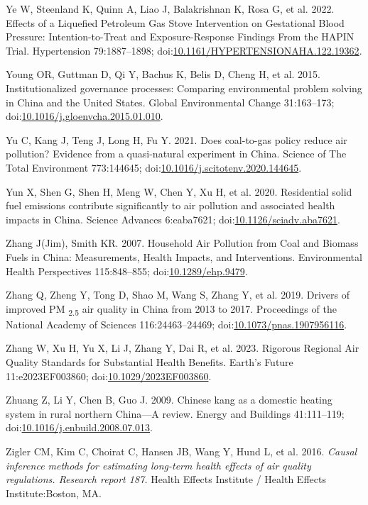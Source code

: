 \documentclass[
  letterpaper,
  DIV=11,
  numbers=noendperiod]{scrartcl}
\newlength{\cslhangindent}
\newenvironment{CSLReferences}[2] %
 {\begin{list}{}{%
  \setlength{\itemindent}{0pt}
  \setlength{\leftmargin}{0pt}
  \setlength{\parsep}{0pt}
  \ifodd #1
   \setlength{\leftmargin}{\cslhangindent}
   \setlength{\itemindent}{-1\cslhangindent}
  \fi
  \setlength{\itemsep}{#2\baselineskip}}}
 {\end{list}}
\begin{document}
\begin{CSLReferences}{1}{1}
Ye W, Steenland K, Quinn A, Liao J, Balakrishnan K, Rosa G, et al. 2022.
Effects of a {Liquefied Petroleum Gas Stove Intervention} on
{Gestational Blood Pressure}: {Intention-to-Treat} and
{Exposure-Response Findings From} the {HAPIN Trial}. Hypertension
79:1887--1898;
doi:\href{https://doi.org/10.1161/HYPERTENSIONAHA.122.19362}{10.1161/HYPERTENSIONAHA.122.19362}.

Young OR, Guttman D, Qi Y, Bachus K, Belis D, Cheng H, et al. 2015.
Institutionalized governance processes: {Comparing} environmental
problem solving in {China} and the {United States}. Global Environmental
Change 31:163--173;
doi:\href{https://doi.org/10.1016/j.gloenvcha.2015.01.010}{10.1016/j.gloenvcha.2015.01.010}.

Yu C, Kang J, Teng J, Long H, Fu Y. 2021. Does coal-to-gas policy reduce
air pollution? {Evidence} from a quasi-natural experiment in {China}.
Science of The Total Environment 773:144645;
doi:\href{https://doi.org/10.1016/j.scitotenv.2020.144645}{10.1016/j.scitotenv.2020.144645}.

Yun X, Shen G, Shen H, Meng W, Chen Y, Xu H, et al. 2020. Residential
solid fuel emissions contribute significantly to air pollution and
associated health impacts in {China}. Science Advances 6:eaba7621;
doi:\href{https://doi.org/10.1126/sciadv.aba7621}{10.1126/sciadv.aba7621}.

Zhang J(Jim), Smith KR. 2007. Household {Air Pollution} from {Coal} and
{Biomass Fuels} in {China}: {Measurements}, {Health Impacts}, and
{Interventions}. Environmental Health Perspectives 115:848--855;
doi:\href{https://doi.org/10.1289/ehp.9479}{10.1289/ehp.9479}.

Zhang Q, Zheng Y, Tong D, Shao M, Wang S, Zhang Y, et al. 2019. Drivers
of improved {PM} {\textsubscript{2.5}} air quality in {China} from 2013
to 2017. Proceedings of the National Academy of Sciences
116:24463--24469;
doi:\href{https://doi.org/10.1073/pnas.1907956116}{10.1073/pnas.1907956116}.

Zhang W, Xu H, Yu X, Li J, Zhang Y, Dai R, et al. 2023. Rigorous
{Regional Air Quality Standards} for {Substantial Health Benefits}.
Earth's Future 11:e2023EF003860;
doi:\href{https://doi.org/10.1029/2023EF003860}{10.1029/2023EF003860}.

Zhuang Z, Li Y, Chen B, Guo J. 2009. Chinese kang as a domestic heating
system in rural northern {China}---{A} review. Energy and Buildings
41:111--119;
doi:\href{https://doi.org/10.1016/j.enbuild.2008.07.013}{10.1016/j.enbuild.2008.07.013}.

Zigler CM, Kim C, Choirat C, Hansen JB, Wang Y, Hund L, et al. 2016.
\emph{Causal inference methods for estimating long-term health effects
of air quality regulations. {Research} report 187.} Health Effects
Institute / Health Effects Institute:Boston, MA.

\end{CSLReferences}
\end{document}

